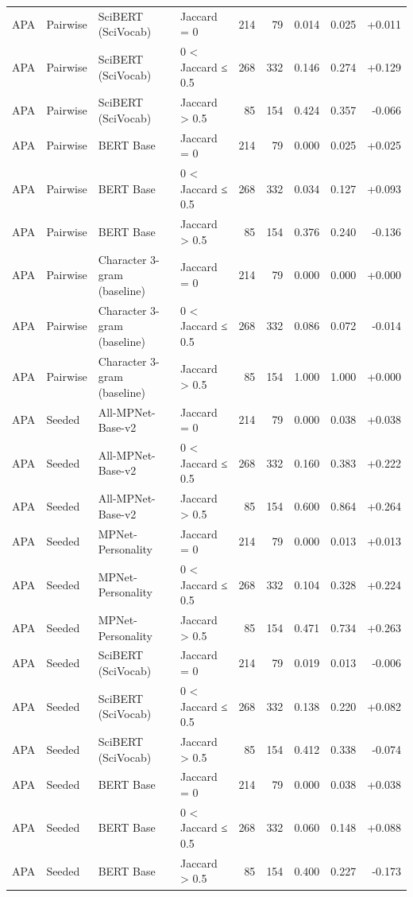 \begin{table}[ht]
\begin{tabular}{llllrrrrr}
APA & Pairwise & SciBERT (SciVocab) & Jaccard = 0 & 214 & 79 & 0.014 & 0.025 & +0.011 \\
APA & Pairwise & SciBERT (SciVocab) & 0 < Jaccard ≤ 0.5 & 268 & 332 & 0.146 & 0.274 & +0.129 \\
APA & Pairwise & SciBERT (SciVocab) & Jaccard > 0.5 & 85 & 154 & 0.424 & 0.357 & -0.066 \\
APA & Pairwise & BERT Base & Jaccard = 0 & 214 & 79 & 0.000 & 0.025 & +0.025 \\
APA & Pairwise & BERT Base & 0 < Jaccard ≤ 0.5 & 268 & 332 & 0.034 & 0.127 & +0.093 \\
APA & Pairwise & BERT Base & Jaccard > 0.5 & 85 & 154 & 0.376 & 0.240 & -0.136 \\
APA & Pairwise & Character 3-gram (baseline) & Jaccard = 0 & 214 & 79 & 0.000 & 0.000 & +0.000 \\
APA & Pairwise & Character 3-gram (baseline) & 0 < Jaccard ≤ 0.5 & 268 & 332 & 0.086 & 0.072 & -0.014 \\
APA & Pairwise & Character 3-gram (baseline) & Jaccard > 0.5 & 85 & 154 & 1.000 & 1.000 & +0.000 \\
APA & Seeded & All-MPNet-Base-v2 & Jaccard = 0 & 214 & 79 & 0.000 & 0.038 & +0.038 \\
APA & Seeded & All-MPNet-Base-v2 & 0 < Jaccard ≤ 0.5 & 268 & 332 & 0.160 & 0.383 & +0.222 \\
APA & Seeded & All-MPNet-Base-v2 & Jaccard > 0.5 & 85 & 154 & 0.600 & 0.864 & +0.264 \\
APA & Seeded & MPNet-Personality & Jaccard = 0 & 214 & 79 & 0.000 & 0.013 & +0.013 \\
APA & Seeded & MPNet-Personality & 0 < Jaccard ≤ 0.5 & 268 & 332 & 0.104 & 0.328 & +0.224 \\
APA & Seeded & MPNet-Personality & Jaccard > 0.5 & 85 & 154 & 0.471 & 0.734 & +0.263 \\
APA & Seeded & SciBERT (SciVocab) & Jaccard = 0 & 214 & 79 & 0.019 & 0.013 & -0.006 \\
APA & Seeded & SciBERT (SciVocab) & 0 < Jaccard ≤ 0.5 & 268 & 332 & 0.138 & 0.220 & +0.082 \\
APA & Seeded & SciBERT (SciVocab) & Jaccard > 0.5 & 85 & 154 & 0.412 & 0.338 & -0.074 \\
APA & Seeded & BERT Base & Jaccard = 0 & 214 & 79 & 0.000 & 0.038 & +0.038 \\
APA & Seeded & BERT Base & 0 < Jaccard ≤ 0.5 & 268 & 332 & 0.060 & 0.148 & +0.088 \\
APA & Seeded & BERT Base & Jaccard > 0.5 & 85 & 154 & 0.400 & 0.227 & -0.173 \\
\bottomrule
\end{tabular}
\end{table}
